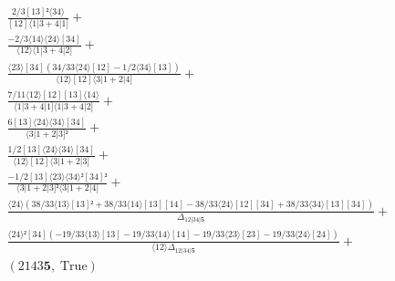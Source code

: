 \documentclass[varwidth, border=5pt]{standalone}
\begin{document}
\begin{my}
$\begin{gathered}
\scriptscriptstyle\frac{2/3[13]²⟨34⟩}{[12]⟨1|3+4|1]} +\\
\scriptscriptstyle\frac{-2/3⟨14⟩⟨24⟩[34]}{⟨12⟩⟨1|3+4|2]} +\\
\scriptscriptstyle\frac{⟨23⟩[34](34/33⟨24⟩[12]-1/2⟨34⟩[13])}{⟨12⟩[12]⟨3|1+2|4]} +\\
\scriptscriptstyle\frac{7/11⟨12⟩[12][13]⟨14⟩}{⟨1|3+4|1]⟨1|3+4|2]} +\\
\scriptscriptstyle\frac{6[13]⟨24⟩⟨34⟩[34]}{⟨3|1+2|3]²} +\\
\scriptscriptstyle\frac{1/2[13]⟨24⟩⟨34⟩[34]}{⟨12⟩[12]⟨3|1+2|3]} +\\
\scriptscriptstyle\frac{-1/2[13]⟨23⟩⟨34⟩²[34]²}{⟨3|1+2|3]²⟨3|1+2|4]} +\\
\scriptscriptstyle\frac{⟨24⟩(38/33⟨13⟩[13]²+38/33⟨14⟩[13][14]-38/33⟨24⟩[12][34]+38/33⟨34⟩[13][34])}{Δ_{12|34|𝟓}} +\\
\scriptscriptstyle\frac{⟨24⟩²[34](-19/33⟨13⟩[13]-19/33⟨14⟩[14]-19/33⟨23⟩[23]-19/33⟨24⟩[24])}{⟨12⟩Δ_{12|34|𝟓}} +\\
\scriptscriptstyle(2143𝟓,\;\text{True}) \phantom{+}
\end{gathered}$
\end{my}
\end{document}
